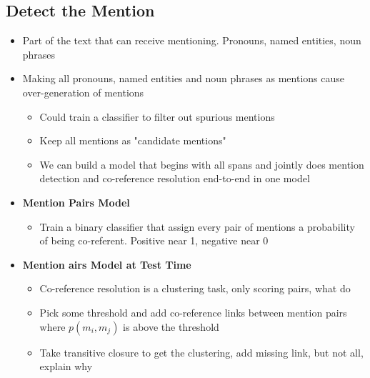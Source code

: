 \subsection{Detect the Mention}
\begin{itemize}
    \item Part of the text that can receive mentioning. Pronouns, named entities, noun phrases
    \item Making all pronouns, named entities and noun phrases as mentions cause over-generation of mentions
    \begin{itemize}
        \item Could train a classifier to filter out spurious mentions
        \item Keep all mentions as "candidate mentions"
        \item We can build a model that begins with all spans and jointly does mention detection and co-reference resolution end-to-end in one model
    \end{itemize}
    \item \textbf{Mention Pairs Model}
    \begin{itemize}
        \item Train a binary classifier that assign every pair of mentions a probability of being co-referent. Positive near 1, negative near 0
    \end{itemize}
    \item \textbf{Mention airs Model at Test Time}
    \begin{itemize}
        \item Co-reference resolution is a clustering task, only scoring pairs, what do
        \item Pick some threshold and add co-reference links between mention pairs where \(p(m_i, m_j)\) is above the threshold
        \item Take transitive closure to get the clustering, add missing link, but not all, explain why
    \end{itemize}
\end{itemize}

